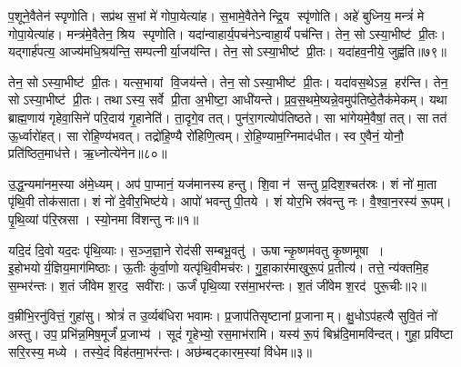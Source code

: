 प॒शूने॒वैतेन॑ स्पृणोति।
सप्र॑थ स॒भां मे॑ गोपा॒येत्या॑ह।
स॒भामे॒वैतेनेन्द्रि॒य स्पृ॑णोति।
अहे॑ बुध्निय॒ मन्त्रं॑ मे गोपा॒येत्या॑ह।
मन्त्र॑मे॒वैतेन॒ श्रिय स्पृणोति।
यदा॑न्वाहार्य॒पच॑नेऽन्वाहा॒र्यं॑ पच॑न्ति।
तेन॒ सोऽस्या॒भीष्ट॑ प्री॒तः।
यद्गार्\mbox{}ह॑पत्य॒ आज्य॑मधि॒श्रय॑न्ति॒ सम्पत्नीर्या॒जय॑न्ति।
तेन॒ सोऽस्या॒भीष्ट॑ प्री॒तः।
यदा॑हव॒नीये॒ जुह्व॑ति॥७९॥

तेन॒ सोऽस्या॒भीष्ट॑ प्री॒तः।
यत्स॒भायां वि॒जय॑न्ते।
तेन॒ सोऽस्या॒भीष्ट॑ प्री॒तः।
यदा॑वस॒थेऽन्न॒ हर॑न्ति।
तेन॒ सोऽस्या॒भीष्ट॑ प्री॒तः।
तथाऽस्य॒ सर्वे प्री॒ता अ॒भीष्टा॒ आधी॑यन्ते।
प्र॒व॒स॒थमे॒ष्यन्ने॒वमुप॑तिष्ठे॒तैक॑मेकम्।
यथा ब्राह्म॒णाय॑ गृहेवा॒सिने॑ परि॒दाय॑ गृ॒हानेति॑।
ता॒दृगे॒व तत्।
पुन॑रा॒गत्योप॑तिष्ठते।
सा भा॑गेयमे॒वैषां॒ तत्।
सा तत॑ ऊ॒र्ध्वारो॑हत्।
सा रो॑हि॒ण्य॑भवत्।
तद्रो॑हि॒ण्यै रो॑हिणि॒त्वम्।
रो॒हि॒ण्याम॒ग्निमाद॑धीत।
स्व ए॒वैनं॒ योनौ॒ प्रति॑ष्ठित॒माध॑त्ते।
ऋ॒ध्नोत्ये॑नेन॥८०॥\anuvakamend[ए॒षा प॒शून्मे॑ गोपा॒येति॒ प्रवि॑ष्टा प॒शून्मे॑ गोपा॒येत्या॑ह॒ जुह्व॑ति तिष्ठते स॒प्त च॑]





\clearpage
{}
\setcounter{anuvakam}{0}

उ॒द्ध॒न्यमा॑नम॒स्या अ॑मे॒ध्यम्।
अप॑ पा॒प्मानं॒ यज॑मानस्य हन्तु।
शि॒वा न॑ सन्तु प्र॒दिश॒श्चत॑स्रः।
शं नो॑ मा॒ता पृ॑थि॒वी तोक॑साता।
शं नो॑ दे॒वीर॒भिष्ट॑ये।
आपो॑ भवन्तु पी॒तये।
शं योर॒भि स्र॑वन्तु नः।
वै॒श्वा॒न॒रस्य॑ रू॒पम्।
पृ॒थि॒व्यां प॑रि॒स्रसा।
स्यो॒नमा वि॑शन्तु नः॥१॥

यदि॒दं दि॒वो यद॒दः पृ॑थि॒व्याः।
स॒ञ्ज॒ज्ञा॒ने रोद॑सी सम्बभू॒वतु॑।
ऊषान्कृ॒ष्णम॑वतु कृ॒ष्णमूषा।
इ॒होभयोर्य॒ज्ञिय॒माग॑मिष्ठाः।
ऊ॒तीः कु॑र्वा॒णो यत्पृ॑थि॒वीमच॑रः।
गु॒हा॒कार॑माखुरू॒पं प्र॒तीत्य॑।
तत्ते॒ न्य॑क्तमि॒ह स॒म्भर॑न्तः।
श॒तं जी॑वेम श॒रद॒ सवी॑राः।
ऊर्जं॑ पृथि॒व्या रस॑मा॒भर॑न्तः।
श॒तं जी॑वेम श॒रद॑ पुरू॒चीः॥२॥

व॒म्रीभि॒रनु॑वित्तं॒ गुहा॑सु।
श्रोत्रं॑ त उ॒र्व्यब॑धिरा भवामः।
प्र॒जाप॑तिसृष्टानां प्र॒जानाम्।
क्षु॒धोऽप॑हत्यै सुवि॒तं नो॑ अस्तु।
उप॒ प्रभि॑न्न॒मिष॒मूर्जं॑ प्र॒जाभ्य॑।
सूदं॑ गृ॒हेभ्यो॒ रस॒माभ॑रामि।
यस्य॑ रू॒पं बिभ्र॑दि॒मामवि॑न्दत्।
गुहा॒ प्रवि॑ष्टा सरि॒रस्य॒ मध्ये।
तस्ये॒दं विह॑तमा॒भर॑न्तः।
अछ॑म्बट्कारम॒स्यां वि॑धेम॥३॥

